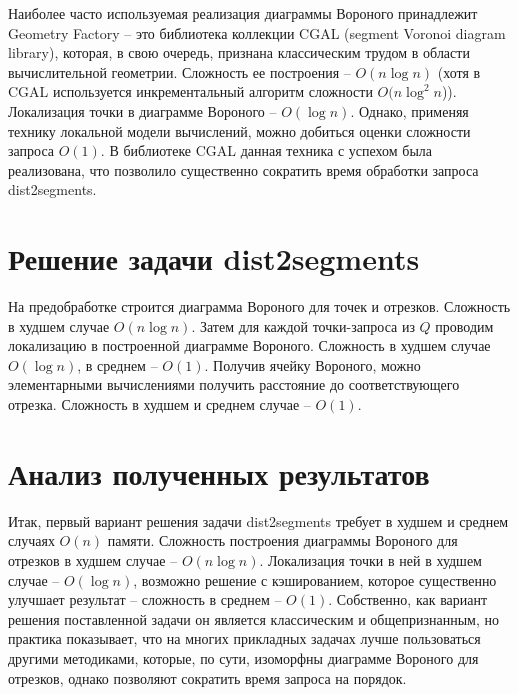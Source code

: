 Наиболее часто используемая реализация диаграммы Вороного принадлежит Geometry
Factory -- это библиотека коллекции CGAL \cite{CGAL} (segment Voronoi diagram library),
которая, в свою очередь, признана классическим трудом в области
вычислительной геометрии.
Сложность ее построения -- $O(n \log n)$ \cite{CGAL} (хотя в CGAL используется
инкрементальный алгоритм сложности $O(n \log^2 n$)). Локализация точки в диаграмме Вороного --
$O(\log n)$. Однако, применяя технику локальной модели вычислений, можно
добиться оценки сложности запроса $O(1)$.
В библиотеке CGAL данная техника с успехом была реализована, что
позволило существенно сократить время обработки запроса dist2segments.

\FloatBarrier
\section{Решение задачи dist2segments}

На предобработке строится диаграмма Вороного для точек и отрезков.
Сложность в худшем случае $O(n \log n)$. Затем для каждой точки-запроса из $Q$
проводим локализацию в построенной диаграмме Вороного. Сложность в
худшем случае $O(\log n)$, в среднем -- $O(1)$. Получив ячейку Вороного, можно
элементарными вычислениями получить расстояние до соответствующего
отрезка. Сложность в худшем и среднем случае -- $O(1)$.

\FloatBarrier
\section{Анализ полученных результатов}

Итак, первый вариант решения задачи dist2segments требует в худшем и
среднем случаях $O(n)$ памяти. Сложность построения диаграммы Вороного для отрезков
 в худшем случае -- $O(n \log n)$. Локализация точки в ней в худшем случае -- $O(\log n)$, 
возможно решение с кэшированием, которое существенно улучшает результат --
сложность в среднем -- $O(1)$. Собственно, как вариант решения поставленной
задачи он является классическим и общепризнанным, но практика показывает,
что на многих прикладных задачах лучше пользоваться другими методиками,
которые, по сути, изоморфны диаграмме Вороного для отрезков, однако позволяют сократить время 
запроса на порядок.

\FloatBarrier
